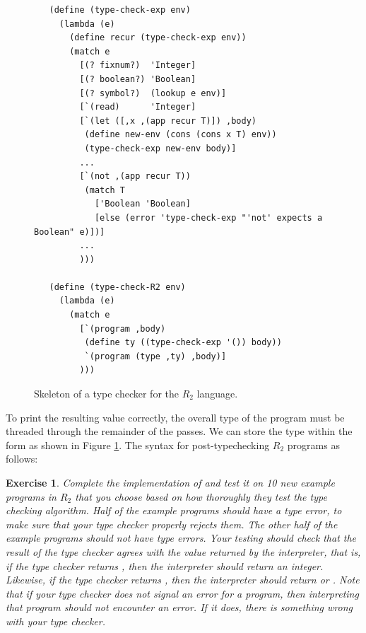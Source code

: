 \documentclass[11pt]{book}
\newtheorem{exercise}[theorem]{Exercise}
\begin{document}
\begin{figure}[tbp]
\begin{lstlisting}
   (define (type-check-exp env)
     (lambda (e)
       (define recur (type-check-exp env))
       (match e
         [(? fixnum?)  'Integer]
         [(? boolean?) 'Boolean]
         [(? symbol?)  (lookup e env)]
         [`(read)      'Integer]
         [`(let ([,x ,(app recur T)]) ,body)
          (define new-env (cons (cons x T) env))
          (type-check-exp new-env body)]
         ...
         [`(not ,(app recur T))
          (match T
            ['Boolean 'Boolean]
            [else (error 'type-check-exp "'not' expects a Boolean" e)])]
         ...
         )))

   (define (type-check-R2 env)
     (lambda (e)
       (match e
         [`(program ,body)
          (define ty ((type-check-exp '()) body))
          `(program (type ,ty) ,body)]
         )))
\end{lstlisting}
\caption{Skeleton of a type checker for the $R_2$ language.}
\label{fig:type-check-R2}
\end{figure}

To print the resulting value correctly, the overall type of the
program must be threaded through the remainder of the passes. We can
store the type within the  form as shown in Figure
\ref{fig:type-check-R2}. The syntax for post-typechecking $R_2$
programs as follows: \\

\begin{exercise}\normalfont
Complete the implementation of  and test it on 10
new example programs in $R_2$ that you choose based on how thoroughly
they test the type checking algorithm. Half of the example programs
should have a type error, to make sure that your type checker properly
rejects them. The other half of the example programs should not have
type errors. Your testing should check that the result of the type
checker agrees with the value returned by the interpreter, that is, if
the type checker returns , then the interpreter should
return an integer. Likewise, if the type checker returns
, then the interpreter should return  or
. Note that if your type checker does not signal an error
for a program, then interpreting that program should not encounter an
error.  If it does, there is something wrong with your type checker.
\end{exercise}
\end{document}
